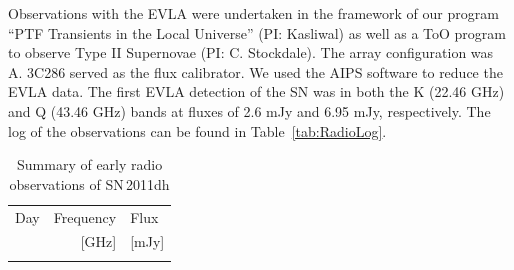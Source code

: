 \documentclass{emulateapj}
\begin{document}
Observations with the EVLA were undertaken in the framework of 
our program  ``PTF Transients in the
Local Universe'' (PI: Kasliwal) as well as a ToO program to observe Type II Supernovae (PI:  C. 
Stockdale). The array configuration was A. 3C286 served as the flux
calibrator. We used the AIPS software to reduce the EVLA data. 
The first EVLA detection of the SN was in both the K (22.46 GHz) and Q
(43.46 GHz) bands at fluxes of 2.6 mJy and 6.95 mJy, respectively. 
The log of the observations can be found in Table~\ref{tab:RadioLog}.
 \begin{table}[!ht]

\caption{Summary of early radio observations of SN\,2011dh}
\smallskip
\begin{center}
\begin{tabular}{lrl}
\hline
\noalign{\smallskip}
Day & Frequency   & Flux    \\
               &  [GHz] & [mJy] \\
\noalign{\smallskip}
\hline
\noalign{\smallskip}



\end{tabular}
\end{center}
\end{table}
\end{document}
